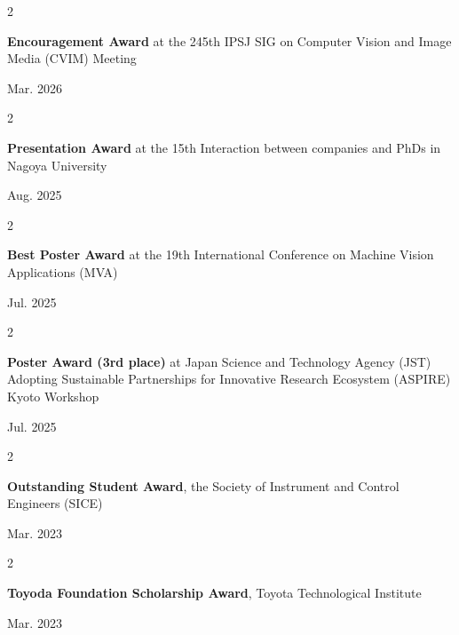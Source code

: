\documentclass[10pt, letterpaper]{article}
\newenvironment{twocolentry}[2][]{
    \onecolentry
    \def\secondColumn{#2}
    \setcolumnwidth{\fill, 4.5 cm}
    \begin{paracol}{2}
}{
    \switchcolumn \raggedleft \secondColumn
    \end{paracol}
    \endonecolentry
} %
\begin{document}
        \begin{twocolentry}{
            Mar. 2026}
            {
            \textbf{Encouragement Award} at the 245th IPSJ SIG on Computer Vision and Image Media (CVIM) Meeting}
        \end{twocolentry}

        \vspace{0.2 cm}

        \begin{twocolentry}{
            Aug. 2025}
            {
            \textbf{Presentation Award} at the 15th Interaction between companies and PhDs in Nagoya University}
        \end{twocolentry}

        \vspace{0.2 cm}
        
        \begin{twocolentry}{
            Jul. 2025}
            {
            \textbf{Best Poster Award} at the 19th International Conference on Machine Vision Applications (MVA)}
        \end{twocolentry}

        \vspace{0.2 cm}
        
        \begin{twocolentry}{
            Jul. 2025}
            {
            \textbf{Poster Award (3rd place)} at Japan Science and Technology Agency (JST) Adopting Sustainable Partnerships for Innovative Research Ecosystem (ASPIRE) Kyoto Workshop}
        \end{twocolentry}

        \vspace{0.2 cm}
        
        \begin{twocolentry}{
            Mar. 2023}
            {
            \textbf{Outstanding Student Award}, the Society of Instrument and Control Engineers (SICE)}
        \end{twocolentry}

        \vspace{0.2 cm}
        
        \begin{twocolentry}{
            Mar. 2023}
            {
            \textbf{Toyoda Foundation Scholarship Award}, Toyota Technological Institute}
        \end{twocolentry}

        \vspace{0.2 cm}
        
\end{document}

